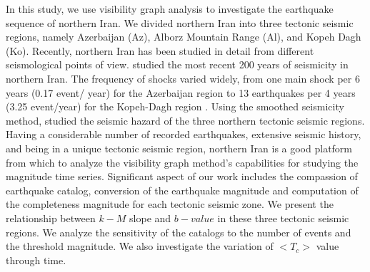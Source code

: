 In this study, we use visibility graph analysis to investigate the earthquake sequence of northern Iran. We divided northern Iran into three tectonic seismic regions, namely Azerbaijan (Az), Alborz Mountain Range (Al), and Kopeh Dagh (Ko).  Recently, northern Iran has been studied in detail from different seismological points of view.  \citet{Nemati2015} studied the most recent 200 years of seismicity in northern Iran. The frequency of shocks varied widely, from one main shock per 6 years (0.17 event/ year) for the Azerbaijan region to 13 earthquakes per 4 years (3.25 event/year) for the Kopeh-Dagh region \citep{Nemati2015}. Using the smoothed seismicity method, \citet{Khoshnevis2016} studied the seismic hazard of the three northern tectonic seismic regions. Having a considerable number of recorded earthquakes, extensive seismic history, and being in a unique tectonic seismic region, northern Iran is a good platform from which to analyze the visibility graph method's capabilities for studying the magnitude time series. Significant aspect of our work includes the compassion of earthquake catalog, conversion of the earthquake magnitude and computation of the completeness magnitude for each tectonic seismic zone. We present the relationship between  $k-M$  slope and $b-value$  in these three tectonic seismic regions. We analyze the sensitivity of the catalogs to the number of events and the threshold magnitude. We also investigate the variation of  $<T_c>$  value through time. 



